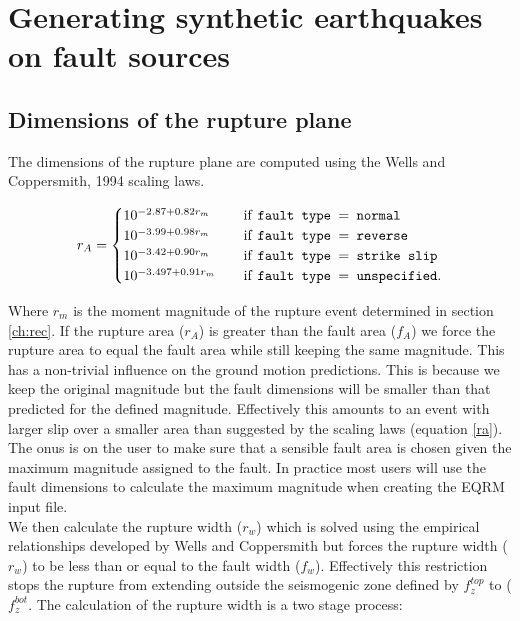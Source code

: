 \section{Generating synthetic earthquakes on fault sources}
\label{sec:fault_gen}

\subsection{Dimensions of the rupture plane}
\label{sec:rup_dimn}

The dimensions of the rupture plane are computed using the Wells and Coppersmith, 1994 scaling laws. 

\begin{equation} \label{ra}
r_A = 
\begin{cases}
10^{-2.87 + 0.82r_m}	& \quad \mbox{if \texttt{fault type $=$  normal}} \\
10^{-3.99 + 0.98r_m}	& \quad \mbox{if \texttt{fault type $=$  reverse}} \\
10^{-3.42 + 0.90r_m}	& \quad \mbox{if \texttt{fault type $=$  strike slip}} \\
10^{-3.497 + 0.91r_m}	& \quad \mbox{if \texttt{fault type $=$  unspecified}} . \\
\end{cases}
\end{equation}

Where $r_m$ is the moment magnitude of the rupture event determined in section \ref{ch:rec}. If the rupture area ($r_A$) is greater than the fault area ($f_A$) 
we force the rupture area to equal the fault area while still keeping the same magnitude. This has a non-trivial influence on the ground motion predictions.  
This is because we keep the original magnitude but the fault dimensions will be smaller than that predicted for the defined magnitude. Effectively this 
amounts to an event with larger slip over a smaller area
than suggested by the scaling laws (equation \ref{ra}). The onus is on the user to make sure that a sensible fault area is chosen given 
the maximum magnitude assigned to the fault. In practice most users will use the fault dimensions to calculate the maximum magnitude
when creating the EQRM input file. \\

We then calculate the rupture width ($r_w$) which is solved using the empirical relationships developed by Wells and Coppersmith \cite{eqrm_Wells94}  
but forces the rupture width ($r_w$) to be less than or equal to the fault width ($f_w$). Effectively this restriction stops the rupture from extending 
outside the seismogenic zone defined by $f_z^{top}$ to ($f_z^{bot}$. The calculation of the rupture width is a two stage process:



